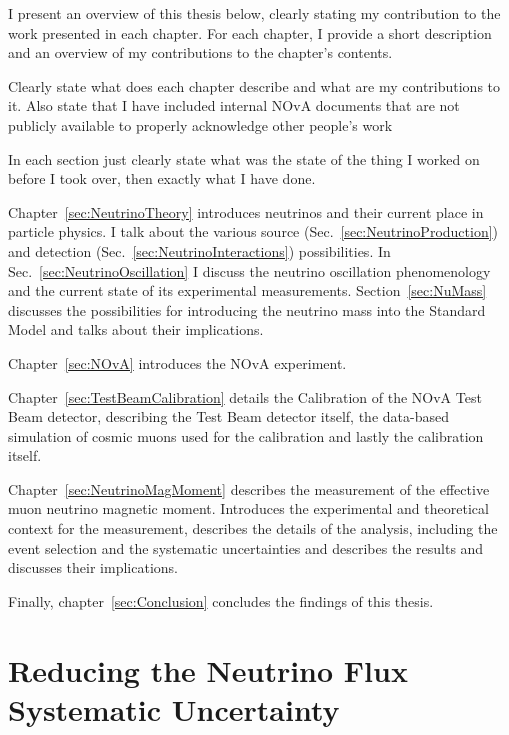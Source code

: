 \label{sec:Preface}

I present an overview of this thesis below, clearly stating my contribution to the work presented in each chapter. For each chapter, I provide a short description and an overview of my contributions to the chapter's contents. 

Clearly state what does each chapter describe and what are my contributions to it. Also state that I have included internal NOvA documents that are not publicly available to properly acknowledge other people's work

In each section just clearly state what was the state of the thing I worked on before I took over, then exactly what I have done.

Chapter~\ref{sec:NeutrinoTheory} introduces neutrinos and their current place in particle physics. I talk about the various source (Sec.~\ref{sec:NeutrinoProduction}) and detection (Sec.~\ref{sec:NeutrinoInteractions}) possibilities. In Sec.~\ref{sec:NeutrinoOscillation} I discuss the neutrino oscillation phenomenology and the current state of its experimental measurements. Section~\ref{sec:NuMass} discusses the possibilities for introducing the neutrino mass into the Standard Model and talks about their implications.

Chapter~\ref{sec:NOvA} introduces the NOvA experiment. 

Chapter~\ref{sec:TestBeamCalibration} details the Calibration of the NOvA Test Beam detector, describing the Test Beam detector itself, the data-based simulation of cosmic muons used for the calibration and lastly the calibration itself.

Chapter~\ref{sec:NeutrinoMagMoment} describes the measurement of the effective muon neutrino magnetic moment. Introduces the experimental and theoretical context for the measurement, describes the details of the analysis, including the event selection and the systematic uncertainties and describes the results and discusses their implications.

Finally, chapter~\ref{sec:Conclusion} concludes the findings of this thesis.

\section*{Reducing the Neutrino Flux Systematic Uncertainty}

